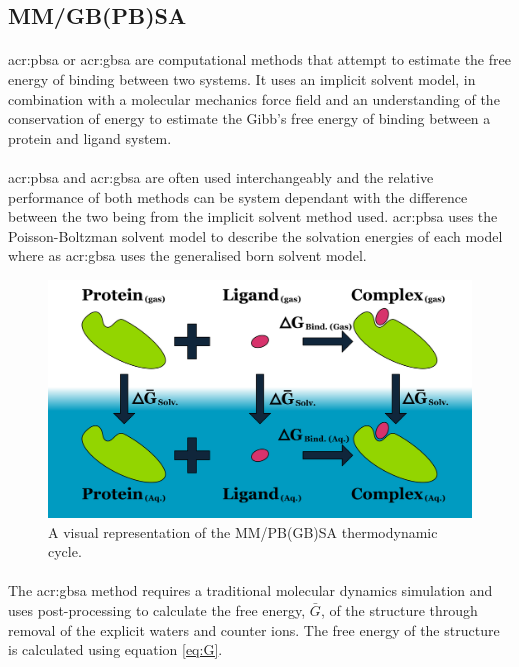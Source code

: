 \subsection{MM/GB(PB)SA}\label{subsection:pbsa-theory}
    \paragraph{}
        \gls{acr:pbsa}\cite{Kollman2000CalculatingModels} or \gls{acr:gbsa} are computational methods that attempt to estimate the free energy of binding between two systems. It uses an implicit solvent model, in combination with a molecular mechanics force field and an understanding of the conservation of energy to estimate the Gibb's free energy of binding between a protein and ligand system.

    \paragraph{}
        \gls{acr:pbsa} and \gls{acr:gbsa} are often used interchangeably and the relative performance of both methods can be system dependant with the difference between the two being from the implicit solvent method used. \gls{acr:pbsa} uses the Poisson-Boltzman solvent model to describe the solvation energies of each model where as \gls{acr:gbsa} uses the generalised born solvent model.
        
\begin{figure}[H]
    \centering
    \includegraphics[width=\textwidth]{Graphics/Theory/gbsa.pdf}
    \caption{A visual representation of the MM/PB(GB)SA thermodynamic cycle.}
    \label{fig:mmpbsa}
\end{figure}

    \paragraph{}
        The \gls{acr:gbsa} method requires a traditional molecular dynamics simulation and uses post-processing to calculate the free energy, $\bar{G}$, of the structure through removal of the explicit waters and counter ions.  The free energy of the structure is calculated using equation \ref{eq:G}.

